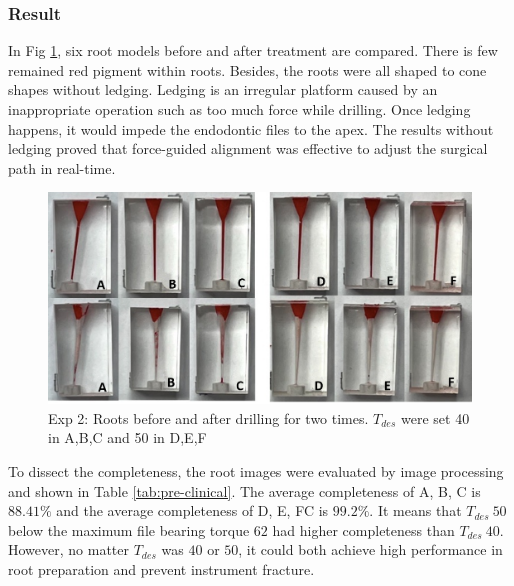 \subsubsection{Result}
\hspace*{6mm}In Fig \ref{fig: exp2_roots}, six root models before and after treatment are compared. There is few remained red pigment within roots. Besides, the roots were all shaped to cone shapes without ledging. Ledging is an irregular platform caused by an inappropriate operation such as too much force while drilling. Once ledging happens, it would impede the endodontic files to the apex. The results without ledging proved that force-guided alignment was effective to adjust the surgical path in real-time.
\begin{figure}[htbp]
\begin{center}
\includegraphics[width=1\linewidth]{Images/exp/roots.png}
\caption{Exp 2: Roots before and after drilling for two times. $T_{des}$ were set 40 in A,B,C and 50 in D,E,F}
\label{fig: exp2_roots}
\end{center}
\end{figure}	
\par
To dissect the completeness, the root images were evaluated by image processing and shown in Table \ref{tab:pre-clinical}. The average completeness of A, B, C is $88.41\%$ and the average completeness of D, E, FC is $99.2\%$. It means that $T_{des}\ 50$ below the maximum file bearing torque $62$ had higher completeness than  $T_{des}\ 40$. However, no matter $T_{des}$ was $40$ or $50$, it could both achieve high performance in root preparation and prevent instrument fracture.

